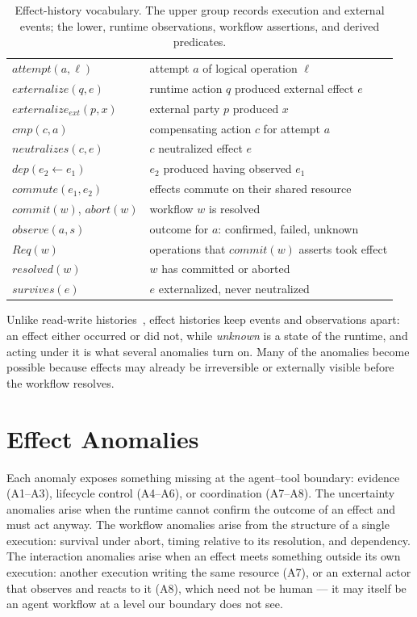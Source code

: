 \documentclass[runningheads]{comsis3}
\begin{document}
\begin{table}[t]
\centering
\renewcommand{\arraystretch}{1.15}
\footnotesize
\caption{Effect-history vocabulary. The upper group records execution and
external events; the lower, runtime observations, workflow assertions, and
derived predicates.}
\label{tab:model}
\begin{tabularx}{\linewidth}{@{}l L@{}}
\toprule
$attempt(a, \ell)$ & attempt $a$ of logical operation $\ell$ \\
$externalize(q, e)$ & runtime action $q$ produced external effect $e$ \\
$externalize_{\mathit{ext}}(p, x)$ & external party $p$ produced $x$ \\
$cmp(c, a)$ & compensating action $c$ for attempt $a$ \\
$neutralizes(c, e)$ & $c$ neutralized effect $e$ \\
$dep(e_2 \leftarrow e_1)$ & $e_2$ produced having observed $e_1$ \\
$commute(e_1, e_2)$ & effects commute on their shared resource \\
$commit(w)$, $abort(w)$ & workflow $w$ is resolved \\
\midrule
$observe(a, s)$ & outcome for $a$: confirmed, failed, unknown \\
$Req(w)$ & operations that $commit(w)$ asserts took effect \\
$resolved(w)$ & $w$ has committed or aborted \\
$survives(e)$ & $e$ externalized, never neutralized \\
\bottomrule
\end{tabularx}
\end{table}

Unlike read-write histories~\cite{adya1999}, effect histories keep events
and observations apart: an effect either occurred or did not, while
\emph{unknown} is a state of the runtime, and acting under it is what
several anomalies turn on. Many of the anomalies become possible because
effects may already be irreversible or externally visible before the
workflow resolves.

\section{Effect Anomalies}
\label{sec:catalog}

Each anomaly exposes something missing at the agent--tool boundary:
evidence (A1--A3), lifecycle control (A4--A6), or coordination (A7--A8).
The uncertainty anomalies arise when the runtime cannot confirm the outcome
of an effect and must act anyway. The workflow anomalies arise from the structure of a single
execution: survival under abort, timing relative to its resolution, and
dependency. The interaction anomalies arise when an effect meets something
outside its own execution: another execution writing the same resource (A7),
or an external actor that observes and reacts to it (A8), which need not be
human --- it may itself be an agent workflow at a level our boundary does not
see.
\end{document}
